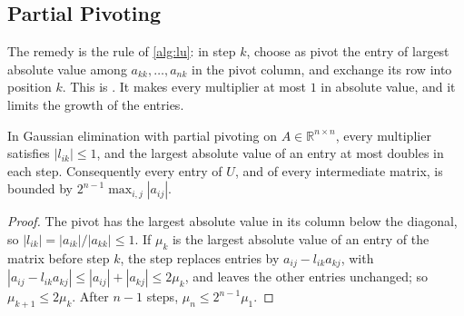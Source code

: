 \subsection{Partial Pivoting}

The remedy is the rule of \cref{alg:lu}: in step $k$, choose as pivot the entry of largest absolute value among $a_{kk},\ldots,a_{nk}$ in the pivot column, and exchange its row into position $k$. This is . It makes every multiplier at most $1$ in absolute value, and it limits the growth of the entries.

\begin{proposition}
\label{prop:partial-pivoting}
In Gaussian elimination with partial pivoting on $A\in\mathbb R^{n\times n}$, every multiplier satisfies $|l_{ik}|\le1$, and the largest absolute value of an entry at most doubles in each step. Consequently every entry of $U$, and of every intermediate matrix, is bounded by $2^{n-1}\max_{i,j}|a_{ij}|$.
\end{proposition}

\begin{proof}
The pivot has the largest absolute value in its column below the diagonal, so $|l_{ik}|=|a_{ik}|/|a_{kk}|\le1$. If $\mu_k$ is the largest absolute value of an entry of the matrix before step $k$, the step replaces entries by $a_{ij}-l_{ik}a_{kj}$, with $|a_{ij}-l_{ik}a_{kj}|\le|a_{ij}|+|a_{kj}|\le2\mu_k$, and leaves the other entries unchanged; so $\mu_{k+1}\le2\mu_k$. After $n-1$ steps, $\mu_n\le2^{n-1}\mu_1$.
\end{proof}

